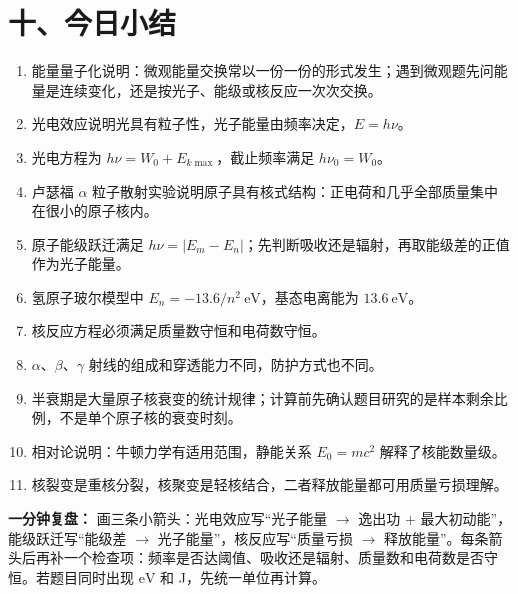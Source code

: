 \section*{十、今日小结}
\enlargethispage{3\baselineskip}
\begin{enumerate}
  \item 能量量子化说明：微观能量交换常以一份一份的形式发生；遇到微观题先问能量是连续变化，还是按光子、能级或核反应一次次交换。
  \item 光电效应说明光具有粒子性，光子能量由频率决定，$E=h\nu$。
  \item 光电方程为 $h\nu=W_0+E_{k\max}$，截止频率满足 $h\nu_0=W_0$。
  \item 卢瑟福 $\alpha$ 粒子散射实验说明原子具有核式结构：正电荷和几乎全部质量集中在很小的原子核内。
  \item 原子能级跃迁满足 $h\nu=|E_m-E_n|$；先判断吸收还是辐射，再取能级差的正值作为光子能量。
  \item 氢原子玻尔模型中 $E_n=-13.6/n^2\ \mathrm{eV}$，基态电离能为 $13.6\ \mathrm{eV}$。
  \item 核反应方程必须满足质量数守恒和电荷数守恒。
  \item $\alpha$、$\beta$、$\gamma$ 射线的组成和穿透能力不同，防护方式也不同。
  \item 半衰期是大量原子核衰变的统计规律；计算前先确认题目研究的是样本剩余比例，不是单个原子核的衰变时刻。
  \item 相对论说明：牛顿力学有适用范围，静能关系 $E_0=mc^2$ 解释了核能数量级。
  \item 核裂变是重核分裂，核聚变是轻核结合，二者释放能量都可用质量亏损理解。
\end{enumerate}

\textbf{一分钟复盘：} 画三条小箭头：光电效应写“光子能量 $\to$ 逸出功 + 最大初动能”，能级跃迁写“能级差 $\to$ 光子能量”，核反应写“质量亏损 $\to$ 释放能量”。每条箭头后再补一个检查项：频率是否达阈值、吸收还是辐射、质量数和电荷数是否守恒。若题目同时出现 $\mathrm{eV}$ 和 J，先统一单位再计算。
